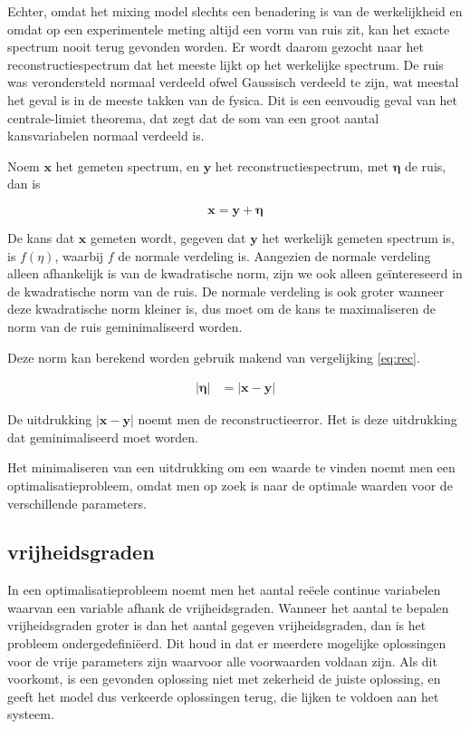 \documentclass[12pt]{report}
\begin{document}
Echter, omdat het mixing model slechts een benadering is van de werkelijkheid en omdat op een experimentele meting altijd een vorm van ruis zit, kan het exacte spectrum nooit terug gevonden worden. Er wordt daarom gezocht naar het reconstructiespectrum dat het meeste lijkt op het werkelijke spectrum. De ruis was verondersteld normaal verdeeld ofwel Gaussisch verdeeld te zijn, wat meestal het geval is in de meeste takken van de fysica. Dit is een eenvoudig geval van het centrale-limiet theorema, dat zegt dat de som van een groot aantal kansvariabelen normaal verdeeld is. 

Noem $\bm{x}$ het gemeten spectrum, en $\bm{y}$ het reconstructiespectrum, met $\bm{\eta}$ de ruis, dan is

\begin{equation}\label{eq:rec}
\bm{x} = \bm{y} + \bm{\eta}
\end{equation}

De kans dat $\bm{x}$ gemeten wordt, gegeven dat $\bm{y}$ het werkelijk gemeten spectrum is, is $f(\eta)$, waarbij $f$ de normale verdeling is. Aangezien de normale verdeling alleen afhankelijk is van de kwadratische norm, zijn we ook alleen ge\"intereseerd in de kwadratische norm van de ruis. De normale verdeling is ook groter wanneer deze kwadratische norm kleiner is, dus moet om de kans te maximaliseren de norm van de ruis geminimaliseerd worden. 

Deze norm kan berekend worden gebruik makend van vergelijking \ref{eq:rec}.

\begin{eqnarray}
\left|\bm{\eta}\right| &= \left|\bm{x} - \bm{y}\right|
\end{eqnarray}

De uitdrukking $\left|\bm{x} - \bm{y}\right|$ noemt men de reconstructieerror. Het is deze uitdrukking dat geminimaliseerd moet worden.

Het minimaliseren van een uitdrukking om een waarde te vinden noemt men een optimalisatieprobleem, omdat men op zoek is naar de optimale waarden voor de verschillende parameters.

\subsection{vrijheidsgraden}

In een optimalisatieprobleem noemt men het aantal re\"eele continue variabelen waarvan een variable afhank de vrijheidsgraden. Wanneer het aantal te bepalen vrijheidsgraden groter is dan het aantal gegeven vrijheidsgraden, dan is het probleem ondergedefini\"eerd. Dit houd in dat er meerdere mogelijke oplossingen voor de vrije parameters zijn waarvoor alle voorwaarden voldaan zijn. Als dit voorkomt, is een gevonden oplossing niet met zekerheid de juiste oplossing, en geeft het model dus verkeerde oplossingen terug, die lijken te voldoen aan het systeem.
\end{document}
